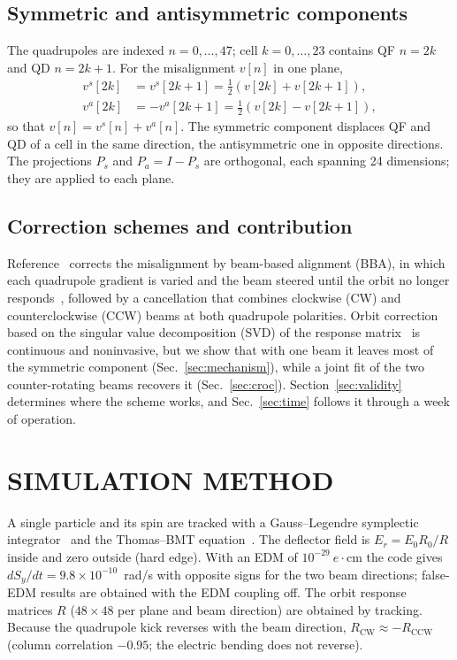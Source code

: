 \documentclass[aps,prab,reprint,superscriptaddress,nofootinbib]{revtex4-2}
\begin{document}
\subsection{Symmetric and antisymmetric components}
\label{sec:symanti}
The quadrupoles are indexed $n=0,\dots,47$; cell $k=0,\dots,23$ contains QF $n=2k$ and QD $n=2k+1$. For the
misalignment $v[n]$ in one plane,
\begin{equation}
\begin{split}
v^s[2k] &= v^s[2k+1] = \tfrac{1}{2}\left(v[2k] + v[2k+1]\right), \\
v^a[2k] &= -v^a[2k+1] = \tfrac{1}{2}\left(v[2k] - v[2k+1]\right),
\end{split}
\label{Eq:symanti}
\end{equation}
so that $v[n]=v^s[n]+v^a[n]$. The symmetric component displaces QF and QD of a cell in the same direction,
the antisymmetric one in opposite directions. The projections $P_s$ and $P_a=I-P_s$ are orthogonal, each
spanning 24 dimensions; they are applied to each plane.

\subsection{Correction schemes and contribution}
Reference~\cite{omarov} corrects the misalignment by beam-based alignment (BBA), in which each quadrupole
gradient is varied and the beam steered until the orbit no longer responds~\cite{marti,huang}, followed by a
cancellation that combines clockwise (CW) and counterclockwise (CCW) beams at both quadrupole polarities. Orbit
correction based on the singular value decomposition (SVD) of the response
matrix~\cite{chung1993,ziemann,mirza,wegscheider} is continuous and noninvasive, but we show that with one
beam it leaves most of the symmetric component (Sec.~\ref{sec:mechanism}), while a joint fit of the two
counter-rotating beams recovers it (Sec.~\ref{sec:croc}). Section~\ref{sec:validity} determines where the
scheme works, and Sec.~\ref{sec:time} follows it through a week of operation.

\section{SIMULATION METHOD}
\label{sec:simulation}
A single particle and its spin are tracked with a Gauss--Legendre symplectic integrator~\cite{hairer} and the
Thomas--BMT equation~\cite{bmt1959}. The deflector field is $E_r=E_0R_0/R$ inside and zero outside (hard
edge). With an EDM of $10^{-29}~e\cdot$cm the code gives $dS_y/dt=9.8\times10^{-10}$~rad/s with opposite signs
for the two beam directions; false-EDM results are obtained with the EDM coupling off. The orbit response
matrices $R$ ($48\times48$ per plane and beam direction) are obtained by tracking. Because the quadrupole
kick reverses with the beam direction, $R_\text{CW}\approx-R_\text{CCW}$ (column correlation $-0.95$; the
electric bending does not reverse).
\end{document}
